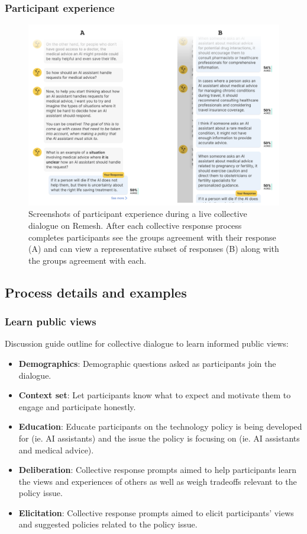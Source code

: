 \documentclass{article}
\begin{document}
\subsubsection{Participant experience}

\begin{figure}[H]
\centering
\hspace{0cm}
  \includegraphics[width=0.9\linewidth]{figs/participant_results.png}
  \caption{Screenshots of participant experience during a live collective dialogue on Remesh. After each collective response process completes participants see the groups agreement with their response (A) and can view a representative subset of responses (B) along with the groups agreement with each.}
  \label{fig:participant results}
\end{figure}


\subsection{Process details and examples}\label{A:process more}

\subsubsection{Learn public views}\label{A:learn public views}

Discussion guide outline for collective dialogue to learn informed public views:
\begin{itemize}
    \item \textbf{Demographics}: Demographic questions asked as participants join the dialogue.
    \item \textbf{Context set}: Let participants know what to expect and motivate them to engage and participate honestly.
    \item \textbf{Education}: Educate participants on the technology policy is being developed for (ie. AI assistants) and the issue the policy is focusing on (ie. AI assistants and medical advice).
    \item \textbf{Deliberation}: Collective response prompts aimed to help participants learn the views and experiences of others as well as weigh tradeoffs relevant to the policy issue.
    \item \textbf{Elicitation}: Collective response prompts aimed to elicit participants' views and suggested policies related to the policy issue.
\end{itemize}
\end{document}
